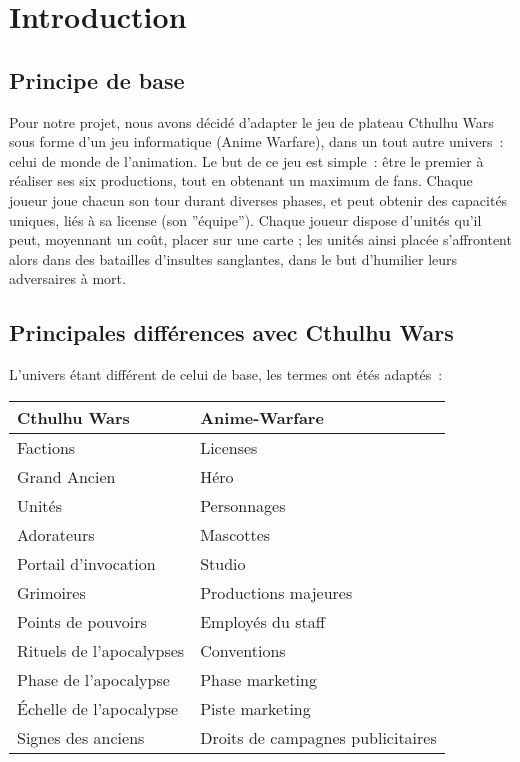 \chapter{Introduction}

    \section{Principe de base}

        Pour notre projet, nous avons décidé d'adapter le jeu de plateau Cthulhu Wars
        sous forme d'un jeu informatique (Anime Warfare), dans un tout autre univers :
        celui de monde de l'animation. Le but de ce jeu est simple : être le premier à
        réaliser ses six productions, tout en obtenant un maximum de fans.
        Chaque joueur joue chacun son tour durant diverses phases, et peut obtenir
        des capacités uniques, liés à sa license (son ''équipe'').
        \newline
        Chaque joueur dispose d'unités qu'il peut, moyennant un coût, placer sur une
        carte ; les unités ainsi placée s'affrontent alors dans des batailles d'insultes
        sanglantes, dans le but d'humilier leurs adversaires à mort.

    \section{Principales différences avec Cthulhu Wars}

        L'univers étant différent de celui de base, les termes ont étés adaptés :
        \begin{center}
            \begin{tabular}{|l|l|}
                \hline
                \textbf{Cthulhu Wars} & \textbf{Anime-Warfare} \\
                \hline
                \hline
                Factions & Licenses \\
                \hline
                Grand Ancien & Héro \\
                \hline
                Unités & Personnages \\
                \hline
                Adorateurs & Mascottes \\
                \hline
                Portail d'invocation & Studio \\
                \hline
                Grimoires & Productions majeures \\
                \hline
                Points de pouvoirs & Employés du staff \\
                \hline
                Rituels de l'apocalypses & Conventions \\
                \hline
                Phase de l'apocalypse & Phase marketing \\
                \hline
                Échelle de l'apocalypse & Piste marketing \\
                \hline
                Signes des anciens & Droits de campagnes publicitaires \\
                \hline
            \end{tabular}
        \end{center}

